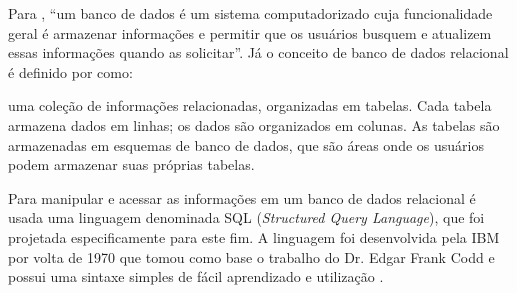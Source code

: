 \par Para  , ``um banco de dados é um
sistema computadorizado cuja funcionalidade geral é armazenar informações e
permitir que os usuários busquem e atualizem essas informações quando as
solicitar''. Já o conceito de banco de dados relacional é definido por
 como:
\begin{citacao}
uma coleção de informações relacionadas, organizadas em tabelas. Cada tabela
armazena dados em linhas; os dados são organizados em colunas. As tabelas são
armazenadas em esquemas de banco de dados, que são áreas  onde os usuários 
podem armazenar suas próprias tabelas.
\end{citacao}
 \par Para manipular e acessar as informações em um banco de dados relacional
 é usada uma linguagem denominada SQL (\textit{Structured Query Language}), que
 foi projetada  especificamente para este fim. A linguagem foi desenvolvida
 pela IBM por volta de 1970 que tomou como base o trabalho do Dr. Edgar Frank
 Codd e possui uma sintaxe simples de fácil aprendizado e utilização \cite{oracle_database_sql}.


